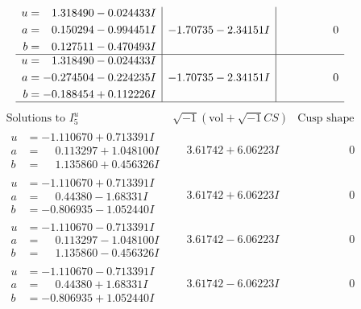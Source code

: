 \documentclass[1p]{elsarticle_modified}
\theoremstyle{definition}
\newcommand{\I}{\sqrt{-1}}
\begin{document}
$$\begin{array}{c|c|c}
\begin{aligned}
u &= \phantom{-}1.318490 - 0.024433 I \\
a &= \phantom{-}0.150294 - 0.994451 I \\
b &= \phantom{-}0.127511 - 0.470493 I\end{aligned}
 & -1.70735 - 2.34151 I & \phantom{-0.000000 } 0 \\ \hline\begin{aligned}
u &= \phantom{-}1.318490 - 0.024433 I \\
a &= -0.274504 - 0.224235 I \\
b &= -0.188454 + 0.112226 I\end{aligned}
 & -1.70735 - 2.34151 I & \phantom{-0.000000 } 0\\
 \hline 
 \end{array}$$\newpage$$\begin{array}{c|c|c}  
\text{Solutions to }I^u_{5}& \I (\text{vol} + \sqrt{-1}CS) & \text{Cusp shape}\\
 \hline 
\begin{aligned}
u &= -1.110670 + 0.713391 I \\
a &= \phantom{-}0.113297 + 1.048100 I \\
b &= \phantom{-}1.135860 + 0.456326 I\end{aligned}
 & \phantom{-}3.61742 + 6.06223 I & \phantom{-0.000000 } 0 \\ \hline\begin{aligned}
u &= -1.110670 + 0.713391 I \\
a &= \phantom{-}0.44380 - 1.68331 I \\
b &= -0.806935 - 1.052440 I\end{aligned}
 & \phantom{-}3.61742 + 6.06223 I & \phantom{-0.000000 } 0 \\ \hline\begin{aligned}
u &= -1.110670 - 0.713391 I \\
a &= \phantom{-}0.113297 - 1.048100 I \\
b &= \phantom{-}1.135860 - 0.456326 I\end{aligned}
 & \phantom{-}3.61742 - 6.06223 I & \phantom{-0.000000 } 0 \\ \hline\begin{aligned}
u &= -1.110670 - 0.713391 I \\
a &= \phantom{-}0.44380 + 1.68331 I \\
b &= -0.806935 + 1.052440 I\end{aligned}
 & \phantom{-}3.61742 - 6.06223 I & \phantom{-0.000000 } 0 \\ \hline\begin{aligned}

\end{aligned}
\end{array}$$
\end{document}

